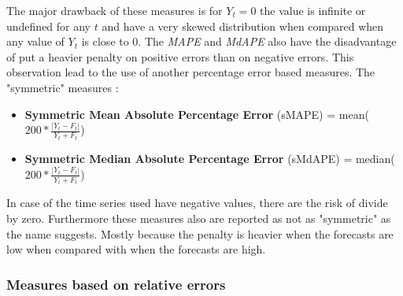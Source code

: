 The major drawback of these measures is for \begin{math} Y_t = 0 \end{math} the
value is infinite or undefined for any \begin{math} t \end{math} and have a
very skewed distribution when compared when any value of \begin{math} Y_t
\end{math} is close to 0.
The \emph{MAPE} and \emph{MdAPE} also have the disadvantage of put a heavier
penalty on positive errors than on negative errors. This observation lead to the
use of another percentage error based measures. The "symmetric" measures
\cite{RePEc:eee:intfor:v:9:y:1993:i:4:p:527-529}:
\begin{itemize}
  \item \textbf{Symmetric Mean Absolute Percentage Error} (sMAPE) = mean(\begin{math}
      200 * \frac{\left| Y_t - F_t \right|}{Y_t + F_t}\end{math})
    \item \textbf{Symmetric Median Absolute Percentage Error} (sMdAPE) = median(\begin{math}
      200 * \frac{\left| Y_t - F_t \right|}{Y_t + F_t}\end{math})
\end{itemize}

In case of the time series used have negative values, there are the risk of
divide by zero. Furthermore these measures also are reported as not as
"symmetric" as the name suggests. Mostly because the penalty is heavier when the
forecasts are low when compared with when the forecasts are high. \cite{Goodwin1999405}

\subsubsection{Measures based on relative errors}

